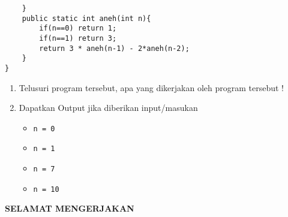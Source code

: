 \documentclass[10pt,openany,a4paper]{article}
\begin{document}
\begin{enumerate}
\begin{verbatim}
	}
	public static int aneh(int n){
	    if(n==0) return 1;
	    if(n==1) return 3;
	    return 3 * aneh(n-1) - 2*aneh(n-2);
	}
}
    \end{verbatim}
\begin{enumerate}[label=(\alph*)]
    \item Telusuri program tersebut, apa yang dikerjakan oleh program tersebut !
    \item Dapatkan Output jika diberikan input/masukan
    \begin{itemize}
        \item \texttt{n = 0}
        \item \texttt{n = 1}
        \item \texttt{n = 7}
        \item \texttt{n = 10}
    \end{itemize}
\end{enumerate}
\end{enumerate}
\begin{center}
    \textbf{SELAMAT MENGERJAKAN}
\end{center}
\end{document}
